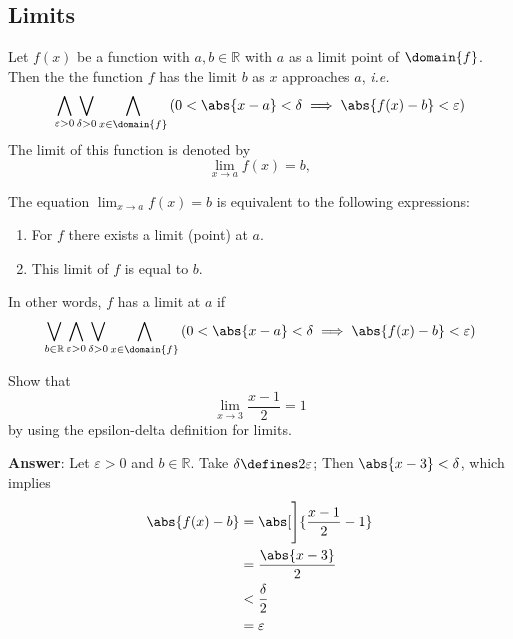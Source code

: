 \subsection{Limits}\label{subsec-limits}

\begin{definition}\label{def-epsilon-delta-definition-limit}
	Let $f(x)$ be a function with $a,b\in\mathbb{R}$ with $a$ as a limit point of $\domain{f}$.
	Then the the function $f$ has the limit $b$ as $x$ approaches $a$, \textit{i.e.}
	\begin{equation}
		\bigwedge_{\varepsilon>0}\bigvee_{\delta>0}\bigwedge_{x\in\domain{f}}
		\left(0<\abs{x-a}<\delta\implies\abs{f(x)-b}<\varepsilon\right)
	\end{equation}
	The limit of this function is denoted by
	\begin{equation}
		\lim_{x\to a}f(x)=b,
	\end{equation}
\end{definition}

\begin{rem}
	The equation $\displaystyle\lim_{x\to a}f(x)=b$ is equivalent to the following
	expressions:
	\begin{enumerate}
		\item For $f$ there exists a limit (point) at $a$.
		\item This limit of $f$ is equal to $b$.
	\end{enumerate}
	In other words, $f$ has a limit at $a$ if
	\begin{equation*}
		\bigvee_{b\in\mathbb{R}}\bigwedge_{\varepsilon>0}\bigvee_{\delta>0}\bigwedge_{x\in\domain{f}}
		\left(0<\abs{x-a}<\delta \implies \abs{f(x)-b}<\varepsilon\right)
	\end{equation*}
\end{rem}

\begin{exm}\label{exm-epsilon-delta-definition-limit:1}
	Show that
	\begin{equation*}
		\lim_{x\to3}\frac{x-1}{2}=1
	\end{equation*}
	by using the epsilon-delta definition for limits.
	\begin{flushleft}
		\textbf{Answer}: Let $\varepsilon>0$ and $b\in\mathbb{R}$. Take
		$\delta\defines2\varepsilon$; Then $\abs{x-3}<\delta$, which implies
		\begin{align*}
			\abs{f(x)-b} & =\abs[\Bigg]{\frac{x-1}{2}-1} \\
			             & =\frac{\abs{x-3}}{2}          \\
			             & <\frac{\delta}{2}             \\
			             & =\varepsilon
		\end{align*}
	\end{flushleft}
\end{exm}

